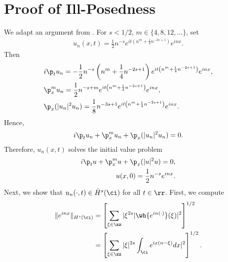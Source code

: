 \section{Proof of Ill-Posedness}
We adapt an argument from \cite{Burq_Gerad_Tzvetkov-An-instability-}. For $s<1/2$, $m \in \{4, 8, 12, \dots\}$, set
%
%
%
%
\begin{equation}
	\label{1ill-soln}
	\begin{split}
		u_{n}(x,t)=\frac{1}{2}n^{-s}e^{it\left( n^{m}+\frac{1}{4}n^{-2s+1}
		\right)}e^{inx}.
	\end{split}
\end{equation}
%
%
Then
%
%
\begin{equation*}
	\begin{split}
		& i \p_t u_{n}
		= -\frac{1}{2}n^{-s}\left( n^{m}+\frac{1}{4}n^{-2s+1} \right)e^{it\left(
		n^{m}+ \frac{1}{4}n^{-2s+1} \right)}e^{inx},
		\\
		& \p_x^{m}u_{n}  = \frac{1}{2}n^{-s+m}e^{it\left(
		n^{m}+\frac{1}{4}n^{-2s+1} \right)}e^{inx},
		\\
		& \p_x (| u_{n} |^{2}u_{n})  = \frac{1}{8}n^{-3s+1}e^{it\left(
		n^{m}+\frac{1}{4}n^{-2s+1} \right)}e^{inx}.
	\end{split}
\end{equation*}
%
%
Hence,
%
%
\begin{equation*}
	\begin{split}
		i \p_t u_{n} + \p_x^{m}u_{n} + \p_x(| u_{n} |^{2} u_{n})
		=0.
	\end{split}
\end{equation*}
%
%
Therefore, $u_{n}(x,t)$ solves the initial value problem
%
%
\begin{gather*}
	\begin{split}
		i \p_t u + \p_x^m u + \p_x (| u |^{2}u) = 0,
		\\
		u(x,0) = \frac{1}{2}n^{-s}e^{inx}.
	\end{split}
\end{gather*}
%
%
Next, we show that $u_{n}(\cdot, t) \in \dot{H}^{s}(\ci)$ for all $t \in \rr$.
First, we compute
%
%
\begin{equation*}
	\begin{split}
		\|e^{inx}\|_{H^{s}(\ci)}
		& =  \left[ \sum_{\xi \in \zz} | \xi ^{2s}
    | \wh{e^{in(\cdot)}}(\xi) |^{2} \right]^{1/2}
		\\
		& =  \left[ \sum_{\xi \in \zz} | \xi |^{2s} 
		\int_{\ci}e^{ix(n- \xi)}dx |^{2}\right]^{1/2}.
	\end{split}
\end{equation*}
